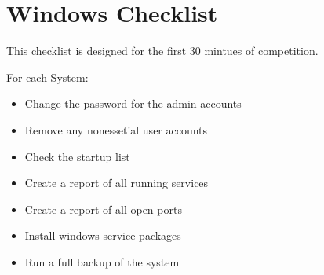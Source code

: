 \section{Windows Checklist}
This checklist is designed for the first 30 mintues of competition.

For each System:
\begin{itemize}
	\item Change the password for the admin accounts
	\item Remove any nonessetial user accounts
	\item Check the startup list
	\item Create a report of all running services
	\item Create a report of all open ports
	\item Install windows service packages
	\item Run a full backup of the system
\end{itemize}
